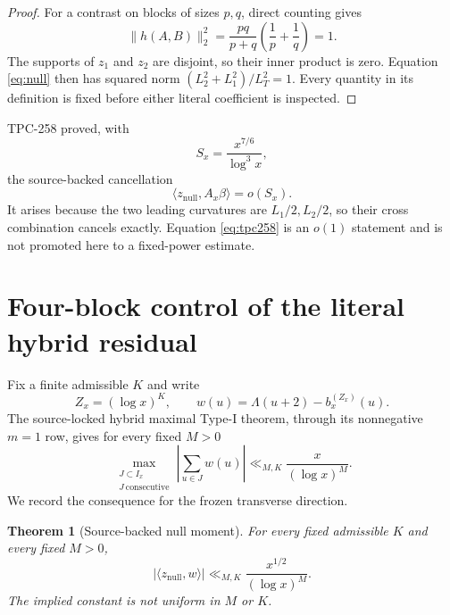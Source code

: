 \documentclass[10pt]{article}
\newtheorem{theorem}{Theorem}
\newcommand{\ip}[2]{\langle #1,#2\rangle}
\newcommand{\Ax}{A_x}
\newcommand{\znull}{z_{\mathrm{null}}}
\begin{document}
\begin{proof}
For a contrast on blocks of sizes \(p,q\), direct counting gives
\[
 \|h(A,B)\|_2^2=\frac{pq}{p+q}\left(\frac1p+\frac1q\right)=1.
\]
The supports of \(z_1\) and \(z_2\) are disjoint, so their inner product is
zero.  Equation \eqref{eq:null} then has squared norm
\((L_2^2+L_1^2)/L_T^2=1\).  Every quantity in its definition is fixed before
either literal coefficient is inspected.
\end{proof}

TPC-258 proved, with
\begin{equation}
 S_x=\frac{x^{7/6}}{\log^3x},                           \label{eq:scale}
\end{equation}
the source-backed cancellation
\begin{equation}
 \ip{\znull}{\Ax\beta}=o(S_x).                         \label{eq:tpc258}
\end{equation}
It arises because the two leading curvatures are \(L_1/2,L_2/2\), so their
cross combination cancels exactly.  Equation \eqref{eq:tpc258} is an
\(o(1)\) statement and is not promoted here to a fixed-power estimate.

\section{Four-block control of the literal hybrid residual}

Fix a finite admissible \(K\) and write
\begin{equation}
 Z_x=(\log x)^K,\qquad
 w(u)=\Lambda(u+2)-b_x^{(Z_x)}(u).                     \label{eq:w}
\end{equation}
The source-locked hybrid maximal Type-I theorem, through its nonnegative
\(m=1\) row, gives for every fixed \(M>0\)
\begin{equation}
 \max_{\substack{J\subset I_x\\J\ \mathrm{consecutive}}}
 \left|\sum_{u\in J}w(u)\right|
 \ll_{M,K}\frac{x}{(\log x)^M}.                       \label{eq:maximal}
\end{equation}
We record the consequence for the frozen transverse direction.

\begin{theorem}[Source-backed null moment]\label{thm:w-null}
For every fixed admissible \(K\) and every fixed \(M>0\),
\begin{equation}
 \boxed{\displaystyle
 |\ip{\znull}{w}|\ll_{M,K}\frac{x^{1/2}}{(\log x)^M}.} \label{eq:w-null}
\end{equation}
The implied constant is not uniform in \(M\) or \(K\).
\end{theorem}
\end{document}
